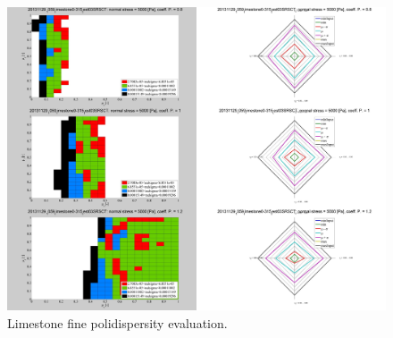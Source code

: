 \begin{figure}[!htb]
\centering
\includegraphics[width=.96\columnwidth]{images/084limestone0315}
\caption[Limestone fine polidispersity evaluation]{Limestone fine polidispersity evaluation.}
\label{fig:084limestone0315}
\end{figure}